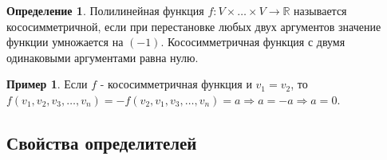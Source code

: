 \documentclass[a4paper, 12pt]{article}
\newcommand{\R}{\mathbb R}
\newcounter{thcount}
\theoremstyle{definition}
\newtheorem*{definition}{Определение}
\newtheorem*{example1}{Пример}
\begin{document}
  \begin{definition}
      Полилинейная функция $f:V\times\dots\times V\to \R$ называется кососимметричной, если при перестановке любых двух аргументов значение функции умножается на $(-1)$. Кососимметричная функция с двумя одинаковыми аргументами равна нулю.
  \end{definition}
  \begin{example1}
    Если $f$ - кососимметричная функция и $v_1=v_2$, то\\
    $f(v_1,v_2,v_3,\dots, v_n)=-f(v_2,v_1,v_3,\dots, v_n)=a \Longrightarrow a=-a \Longrightarrow a=0$.
  \end{example1}

  \subsection{Свойства определителей}

  \setcounter{thcount}{0}
\end{document}
